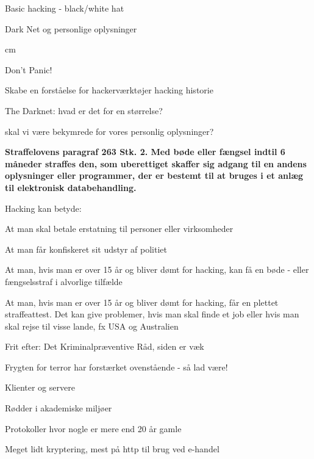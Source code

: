 \documentclass[20pt,landscape,a4paper]{foils}
\begin{document}

\mytitlepage
{Basic hacking - black/white hat

Dark Net og personlige oplysninger}



 cm


\centerline{\color{titlecolor}\LARGE Don't Panic!}

\begin{list1}
\item Skabe en forståelse for hackerværktøjer hacking historie
\item The Darknet: hvad er det for en størrelse?
\item skal vi være bekymrede for vores personlig oplysninger?
\end{list1}




{\bfseries Straffelovens paragraf 263 Stk. 2. Med bøde eller fængsel
  indtil 6 måneder
straffes den, som uberettiget skaffer sig adgang til en andens
oplysninger eller programmer, der er bestemt til at bruges i et anlæg
til elektronisk databehandling.}

Hacking kan betyde:
\begin{list2}
\item At man skal betale erstatning til personer eller virksomheder
\item At man får konfiskeret sit udstyr af politiet
\item At man, hvis man er over 15 år og bliver dømt for hacking, kan
  få en bøde - eller fængselsstraf i alvorlige tilfælde
\item At man, hvis man er over 15 år og bliver dømt for hacking, får
en plettet straffeattest. Det kan give problemer, hvis man skal finde
et job eller hvis man skal rejse til visse lande, fx USA og
Australien
\item Frit efter:  Det
  Kriminalpræventive Råd, siden er væk
\item Frygten for terror har forstærket ovenstående - så lad være!
\end{list2}





\begin{list1}
\item Klienter og servere
\item Rødder i akademiske miljøer
\item Protokoller hvor nogle er mere end 20 år gamle
\item Meget lidt kryptering, mest på http til brug ved e-handel
\end{list1}
\end{document}
